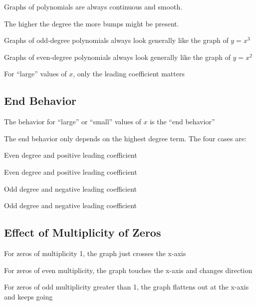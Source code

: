 \documentclass{article}
\begin{document}
\begin{itemize*}
  \item Graphs of polynomials are always continuous and smooth.
  \item The higher the degree the more bumps might be present.
  \item Graphs of odd-degree polynomials always look generally like the graph of $y = x^3$
  \item Graphs of even-degree polynomials always look generally like the graph of $y = x^2$
  \item For ``large'' values of $x$, only the leading coefficient matters
\end{itemize*}

\subsection{End Behavior}
\begin{itemize*}
  \item The behavior for ``large'' or ``small'' values of $x$ is the ``end behavior''
  \item The end behavior only depends on the highest degree term.  The four cases are:
    \begin{itemize*}
      \item Even degree and positive leading coefficient
      \item Even degree and positive leading coefficient
      \item Odd degree and negative leading coefficient
      \item Odd degree and negative leading coefficient
    \end{itemize*}
\end{itemize*}

\subsection{Effect of Multiplicity of Zeros}
\begin{itemize*}
  \item For zeros of multiplicity 1, the graph just crosses the x-axis
  \item For zeros of even multiplicity, the graph touches the x-axis and changes direction
  \item For zeros of odd multiplicity greater than 1, the graph flattens out at the x-axis and keeps going
\end{itemize*}
\end{document}
